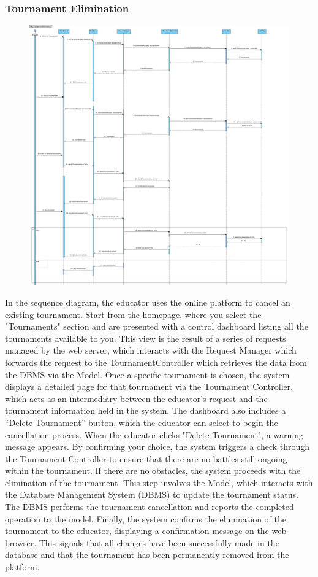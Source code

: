 \subsubsection{Tournament Elimination}
\begin{figure}[H]
    \centering
    \includegraphics[width=1\textwidth]{SequenceDiagram/TournamentElimination.png}
    \label{fig:enter-label}
\end{figure}
In the sequence diagram, the educator uses the online platform to cancel an existing tournament. Start from the homepage, where you select the "Tournaments" section and are presented with a control dashboard listing all the tournaments available to you. This view is the result of a series of requests managed by the web server, which interacts with the Request Manager which forwards the request to the TournamentController which retrieves the data from the DBMS via the Model.
Once a specific tournament is chosen, the system displays a detailed page for that tournament via the Tournament Controller, which acts as an intermediary between the educator's request and the tournament information held in the system. The dashboard also includes a “Delete Tournament” button, which the educator can select to begin the cancellation process.
When the educator clicks "Delete Tournament", a warning message appears. By confirming your choice, the system triggers a check through the Tournament Controller to ensure that there are no battles still ongoing within the tournament.
If there are no obstacles, the system proceeds with the elimination of the tournament. This step involves the Model, which interacts with the Database Management System (DBMS) to update the tournament status. The DBMS performs the tournament cancellation and reports the completed operation to the model.
Finally, the system confirms the elimination of the tournament to the educator, displaying a confirmation message on the web browser. This signals that all changes have been successfully made in the database and that the tournament has been permanently removed from the platform.

